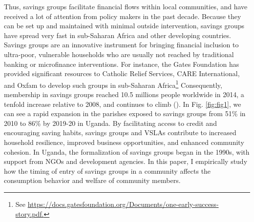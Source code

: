 \documentclass[12pt]{article}
\begin{document}
{\hspace{1cm} Thus, savings groups facilitate financial flows within local communities, and have received a lot of attention from policy makers in the past decade. Because they can be set up and maintained with minimal outside intervention, savings groups have spread very fast in sub-Saharan Africa and other developing countries. Savings groups are an innovative instrument for bringing financial inclusion to ultra-poor, vulnerable households who are usually not reached by traditional banking or microfinance interventions. For instance, the Gates Foundation has provided significant resources to Catholic Relief Services, CARE International, and Oxfam to develop such groups in
sub-Saharan Africa\footnote{See \url{https://docs.gatesfoundation.org/Documents/one-early-success-story.pdf.}} Consequently, membership in savings groups reached 10.5 millions people worldwide in 2014, a tenfold increase relative to 2008, and continues to climb (\cite{burlando}). In Fig. \ref{fig:fig1}, we can see a rapid expansion in the parishes exposed to savings groups from 51\% in 2010 to 86\% by 2019-20 in Uganda. By facilitating access to credit and encouraging saving habits, savings groups and VSLAs contribute to increased household resilience, improved business opportunities, and enhanced community cohesion. In Uganda, the formalization of savings groups began in the 1990s, with support from NGOs and development agencies. In this paper, I empirically study how the timing of entry of savings groups in a community affects the consumption behavior and welfare of community members.

}
\end{document}

